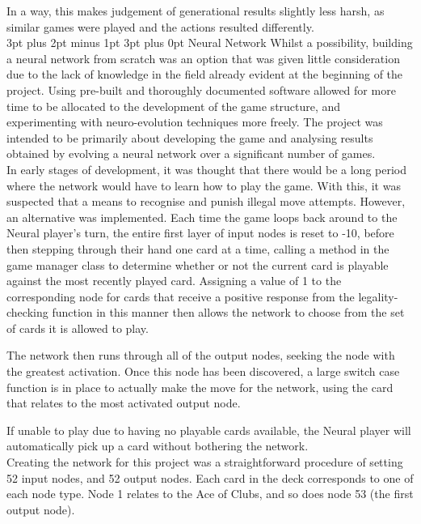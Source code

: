 \documentclass[12pt,a4paper]{article}
\makeatletter
\renewcommand\subsection{\@startsection {subsection}{1}{2mm} %
                               {3pt plus 2pt minus 1pt} %
                               {3pt plus 0pt} %
                               {\normalfont\bfseries}}
\makeatother
\begin{document}
In a way, this makes judgement of generational results slightly less harsh, as similar games were played and the actions resulted differently.\\


\subsection{Neural Network}
Whilst a possibility, building a neural network from scratch was an option that was given little consideration due to the lack of knowledge in the field already evident at the beginning of the project. Using pre-built and thoroughly documented software allowed for more time to be allocated to the development of the game structure, and experimenting with neuro-evolution techniques more freely. The project was intended to be primarily about developing the game and analysing results obtained by evolving a neural network over a significant number of games. \\

In early stages of development, it was thought that there would be a long period where the network would have to learn how to play the game. With this, it was suspected that a means to recognise and punish illegal move attempts. However, an alternative was implemented. Each time the game loops back around to the Neural player's turn, the entire first layer of input nodes is reset to -10, before then stepping through their hand one card at a time, calling a method in the game manager class to determine whether or not the current card is playable against the most recently played card. Assigning a value of 1 to the corresponding node for cards that receive a positive response from the legality-checking function in this manner then allows the network to choose from the set of cards it is allowed to play.

The network then runs through all of the output nodes, seeking the node with the greatest activation. Once this node has been discovered, a large switch case function is in place to actually make the move for the network, using the card that relates to the most activated output node. 

If unable to play due to having no playable cards available, the Neural player will automatically pick up a card without bothering the network.\\

Creating the network for this project was a straightforward procedure of setting 52 input nodes, and 52 output nodes. Each card in the deck corresponds to one of each node type. Node 1 relates to the Ace of Clubs, and so does node 53 (the first output node). 
\end{document}
